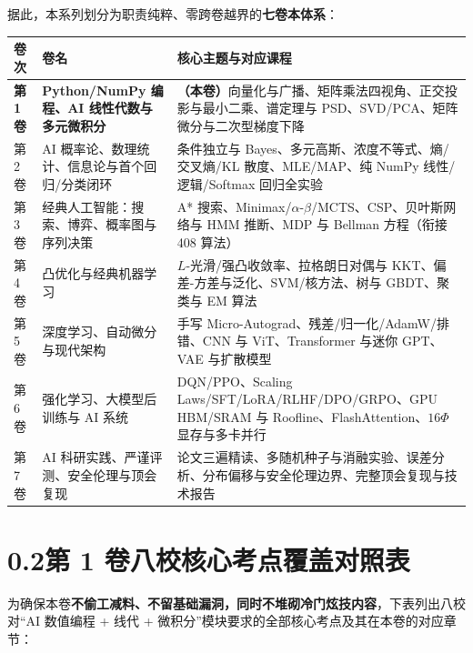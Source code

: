 据此，本系列划分为职责纯粹、零跨卷越界的\textbf{七卷本体系}：
\begin{center}
\small
\begin{tabularx}{\linewidth}{@{}p{13mm}p{52mm}X@{}}
\toprule
\textbf{卷次} & \textbf{卷名} & \textbf{核心主题与对应课程} \\
\midrule
\textbf{第 1 卷} & \textbf{Python/NumPy 编程、AI 线性代数与多元微积分} & \textbf{（本卷）}向量化与广播、矩阵乘法四视角、正交投影与最小二乘、谱定理与 PSD、SVD/PCA、矩阵微分与二次型梯度下降 \\
第 2 卷 & AI 概率论、数理统计、信息论与首个回归/分类闭环 & 条件独立与 Bayes、多元高斯、浓度不等式、熵/交叉熵/KL 散度、MLE/MAP、纯 NumPy 线性/逻辑/Softmax 回归全实验 \\
第 3 卷 & 经典人工智能：搜索、博弈、概率图与序列决策 & A* 搜索、Minimax/$\alpha$-$\beta$/MCTS、CSP、贝叶斯网络与 HMM 推断、MDP 与 Bellman 方程（衔接 408 算法） \\
第 4 卷 & 凸优化与经典机器学习 & $L$-光滑/强凸收敛率、拉格朗日对偶与 KKT、偏差-方差与泛化、SVM/核方法、树与 GBDT、聚类与 EM 算法 \\
第 5 卷 & 深度学习、自动微分与现代架构 & 手写 Micro-Autograd、残差/归一化/AdamW/排错、CNN 与 ViT、Transformer 与迷你 GPT、VAE 与扩散模型 \\
第 6 卷 & 强化学习、大模型后训练与 AI 系统 & DQN/PPO、Scaling Laws/SFT/LoRA/RLHF/DPO/GRPO、GPU HBM/SRAM 与 Roofline、FlashAttention、$16\Phi$ 显存与多卡并行 \\
第 7 卷 & AI 科研实践、严谨评测、安全伦理与顶会复现 & 论文三遍精读、多随机种子与消融实验、误差分析、分布偏移与安全伦理边界、完整顶会复现与技术报告 \\
\bottomrule
\end{tabularx}
\end{center}

\section*{0.2\quad 第 1 卷八校核心考点覆盖对照表}

为确保本卷\textbf{不偷工减料、不留基础漏洞，同时不堆砌冷门炫技内容}，下表列出八校对“AI 数值编程 + 线代 + 微积分”模块要求的全部核心考点及其在本卷的对应章节：

